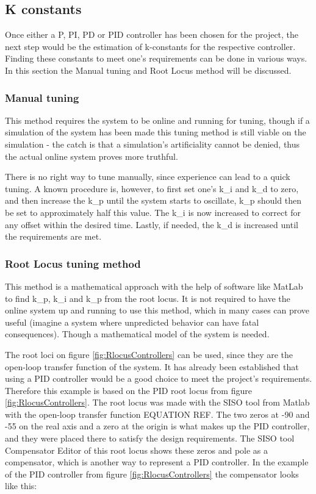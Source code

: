 \subsection{K constants}

Once either a P, PI, PD or PID controller has been chosen for the project, the next step would be the estimation of k-constants for the respective controller. Finding these constants to meet one's requirements can be done in various ways. In this section the Manual tuning and Root Locus method will be discussed.


\subsubsection{Manual tuning}

This method requires the system to be online and running for tuning, though if a simulation of the system has been made this tuning method is still viable on the simulation - the catch is that a simulation’s artificiality cannot be denied, thus the actual online system proves more truthful.\par

There is no right way to tune manually, since experience can lead to a quick tuning. A known procedure is, however, to first set one’s k\_i and k\_d to zero, and then increase the k\_p until the system starts to oscillate, k\_p should then be set to approximately half this value. The k\_i is now increased to correct for any offset within the desired time. Lastly, if needed, the k\_d is increased until the requirements are met.


\subsubsection{Root Locus tuning method}

This method is a mathematical approach with the help of software like MatLab to find k\_p, k\_i and k\_p from the root locus. It is not required to have the online system up and running to use this method, which in many cases can prove useful (imagine a system where unpredicted behavior can have fatal consequences). Though a mathematical model of the system is needed.\par

The root loci on figure \ref{fig:RlocusControllers} can be used, since they are the open-loop transfer function of the system. It has already been established that using a PID controller would be a good choice to meet the project’s requirements. Therefore this example is based on the PID root locus from figure \ref{fig:RlocusControllers}. The root locus was made with the SISO tool from Matlab with the open-loop transfer function EQUATION REF. The two zeros at -90 and -55 on the real axis and a zero at the origin  is what makes up the PID controller, and they were placed there to satisfy the design requirements. The SISO tool Compensator Editor of this root locus shows these zeros and pole as a compensator, which is another way to represent a PID controller. In the example of the PID controller from figure \ref{fig:RlocusControllers}  the compensator looks like this:\\ 

